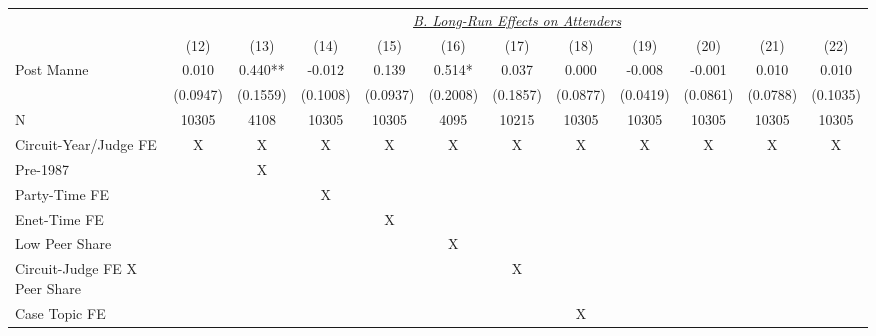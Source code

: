 \begin{center}
{\begin{tabular}{l*{11}{c}}
                    &\multicolumn{11}{c}{\uline{\textit{B. Long-Run Effects on Attenders}}}                                                                                              \\
                    &        (12)  &        (13)  &        (14)  &        (15)  &        (16)  &        (17)  &        (18)  &        (19)  &        (20)  &        (21)  &        (22)  \\
\cmidrule(lr){2-12}
Post Manne          &       0.010  &       0.440**&      -0.012  &       0.139  &       0.514* &       0.037  &       0.000  &      -0.008  &      -0.001  &       0.010  &       0.010  \\
                    &    (0.0947)  &    (0.1559)  &    (0.1008)  &    (0.0937)  &    (0.2008)  &    (0.1857)  &    (0.0877)  &    (0.0419)  &    (0.0861)  &    (0.0788)  &    (0.1035)  \\
\cmidrule(lr){1-12}
N                   &       10305  &        4108  &       10305  &       10305  &        4095  &       10215  &       10305  &       10305  &       10305  &       10305  &       10305  \\
Circuit-Year/Judge FE&           X  &           X  &           X  &           X  &           X  &           X  &           X  &           X  &           X  &           X  &           X  \\
Pre-1987            &              &           X  &              &              &              &              &              &              &              &              &              \\
Party-Time FE       &              &              &           X  &              &              &              &              &              &              &              &              \\
Enet-Time FE        &              &              &              &           X  &              &              &              &              &              &              &              \\
Low Peer Share      &              &              &              &              &           X  &              &              &              &              &              &              \\
Circuit-Judge FE X Peer Share&              &              &              &              &              &           X  &              &              &              &              &              \\
Case Topic FE       &              &              &              &              &              &              &           X  &              &              &              &              \\

\end{tabular}}
\end{center}
